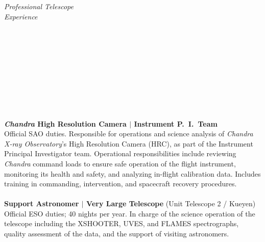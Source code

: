 \documentclass[11pt]{article}
\begin{document}
\hspace{2.5mm} \parbox{1.5in}{\textit{Professional Telescope \\ Experience \\\\\\\\\\\\\\\\\\\\}} \parbox{5.15in}{
\textbf{\textit{Chandra} High Resolution Camera $|$ Instrument P.~I.~Team}\\
Official SAO duties. Responsible for operations and science analysis
of \textit{Chandra X-ray Observatory}'s High Resolution Camera (HRC), as part of the Instrument Principal Investigator team. Operational responsibilities include reviewing \textit{Chandra} command loads to ensure safe operation of the flight instrument, monitoring its health and safety, and analyzing in-flight calibration data. Includes training in commanding, intervention, and spacecraft recovery procedures.
\\\\
\textbf{Support Astronomer $|$ Very Large Telescope} (Unit Telescope 2 / Kueyen)\\
Official ESO duties; 40 nights per year. In charge of the science operation of the telescope including the XSHOOTER, UVES, and FLAMES spectrographs, quality assessment of the data, and the support of visiting astronomers.
}\\



\vspace{4mm}
\end{document}
